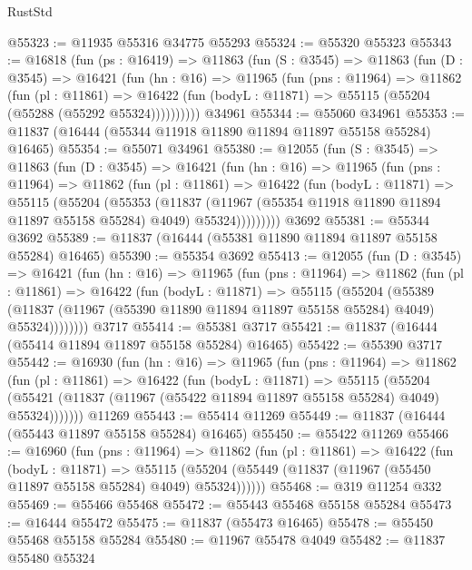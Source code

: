 \begin{lexlean}{RustStd}
\begin{coremodule}
@55323 := @11935 @55316 @34775 @55293
@55324 := @55320 @55323
@55343 := @16818
    (fun (ps : @16419) =>
    @11863
      (fun (S : @3545) =>
      @11863
        (fun (D : @3545) =>
        @16421
          (fun (hn : @16) =>
          @11965
            (fun (pns : @11964) =>
            @11862
              (fun (pl : @11861) =>
              @16422 (fun (bodyL : @11871) => @55115 (@55204 (@55288 (@55292 @55324))))))))))
    @34961
@55344 := @55060 @34961
@55353 := @11837 (@16444 (@55344 @11918 @11890 @11894 @11897 @55158 @55284) @16465)
@55354 := @55071 @34961
@55380 := @12055
    (fun (S : @3545) =>
    @11863
      (fun (D : @3545) =>
      @16421
        (fun (hn : @16) =>
        @11965
          (fun (pns : @11964) =>
          @11862
            (fun (pl : @11861) =>
            @16422
              (fun (bodyL : @11871) =>
              @55115
                (@55204
                  (@55353
                    (@11837
                      (@11967 (@55354 @11918 @11890 @11894 @11897 @55158 @55284) @4049)
                      @55324)))))))))
    @3692
@55381 := @55344 @3692
@55389 := @11837 (@16444 (@55381 @11890 @11894 @11897 @55158 @55284) @16465)
@55390 := @55354 @3692
@55413 := @12055
    (fun (D : @3545) =>
    @16421
      (fun (hn : @16) =>
      @11965
        (fun (pns : @11964) =>
        @11862
          (fun (pl : @11861) =>
          @16422
            (fun (bodyL : @11871) =>
            @55115
              (@55204
                (@55389
                  (@11837 (@11967 (@55390 @11890 @11894 @11897 @55158 @55284) @4049) @55324))))))))
    @3717
@55414 := @55381 @3717
@55421 := @11837 (@16444 (@55414 @11894 @11897 @55158 @55284) @16465)
@55422 := @55390 @3717
@55442 := @16930
    (fun (hn : @16) =>
    @11965
      (fun (pns : @11964) =>
      @11862
        (fun (pl : @11861) =>
        @16422
          (fun (bodyL : @11871) =>
          @55115
            (@55204
              (@55421 (@11837 (@11967 (@55422 @11894 @11897 @55158 @55284) @4049) @55324)))))))
    @11269
@55443 := @55414 @11269
@55449 := @11837 (@16444 (@55443 @11897 @55158 @55284) @16465)
@55450 := @55422 @11269
@55466 := @16960
    (fun (pns : @11964) =>
    @11862
      (fun (pl : @11861) =>
      @16422
        (fun (bodyL : @11871) =>
        @55115 (@55204 (@55449 (@11837 (@11967 (@55450 @11897 @55158 @55284) @4049) @55324))))))
@55468 := @319 @11254 @332
@55469 := @55466 @55468
@55472 := @55443 @55468 @55158 @55284
@55473 := @16444 @55472
@55475 := @11837 (@55473 @16465)
@55478 := @55450 @55468 @55158 @55284
@55480 := @11967 @55478 @4049
@55482 := @11837 @55480 @55324

\end{coremodule}
\end{lexlean}
